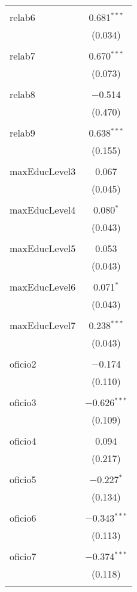 \begin{table}[!htbp]
\begin{tabular}{@{\extracolsep{5pt}}lc}
  & \\ 
 relab6 & 0.681$^{***}$ \\ 
  & (0.034) \\ 
  & \\ 
 relab7 & 0.670$^{***}$ \\ 
  & (0.073) \\ 
  & \\ 
 relab8 & $-$0.514 \\ 
  & (0.470) \\ 
  & \\ 
 relab9 & 0.638$^{***}$ \\ 
  & (0.155) \\ 
  & \\ 
 maxEducLevel3 & 0.067 \\ 
  & (0.045) \\ 
  & \\ 
 maxEducLevel4 & 0.080$^{*}$ \\ 
  & (0.043) \\ 
  & \\ 
 maxEducLevel5 & 0.053 \\ 
  & (0.043) \\ 
  & \\ 
 maxEducLevel6 & 0.071$^{*}$ \\ 
  & (0.043) \\ 
  & \\ 
 maxEducLevel7 & 0.238$^{***}$ \\ 
  & (0.043) \\ 
  & \\ 
 oficio2 & $-$0.174 \\ 
  & (0.110) \\ 
  & \\ 
 oficio3 & $-$0.626$^{***}$ \\ 
  & (0.109) \\ 
  & \\ 
 oficio4 & 0.094 \\ 
  & (0.217) \\ 
  & \\ 
 oficio5 & $-$0.227$^{*}$ \\ 
  & (0.134) \\ 
  & \\ 
 oficio6 & $-$0.343$^{***}$ \\ 
  & (0.113) \\ 
  & \\ 
 oficio7 & $-$0.374$^{***}$ \\ 
  & (0.118) \\ 
  & \\ 

\end{tabular}
\end{table}
